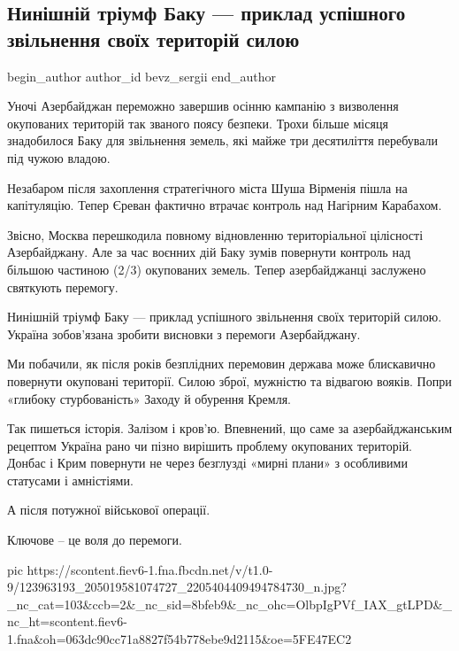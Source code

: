  
 
 
 
 
 
\subsection{Нинішній тріумф Баку — приклад успішного звільнення своїх територій силою}
\label{sec:10_11_2020.fb.bevz_sergii.1.triumf_baku}
\ifcmt
	begin_author
   author_id bevz_sergii
	end_author
\fi

Уночі Азербайджан переможно завершив осінню кампанію з визволення окупованих
територій так званого поясу безпеки. Трохи більше місяця знадобилося Баку для
звільнення земель, які майже три десятиліття перебували під чужою владою.

Незабаром після захоплення стратегічного міста Шуша Вірменія пішла на
капітуляцію. Тепер Єреван фактично втрачає контроль над Нагірним Карабахом.

Звісно, Москва перешкодила повному відновленню територіальної цілісності
Азербайджану. Але за час воєнних дій Баку зумів повернути контроль над більшою
частиною (2/3) окупованих земель. Тепер азербайджанці заслужено святкують
перемогу.

Нинішній тріумф Баку — приклад успішного звільнення своїх територій силою.
Україна зобов’язана зробити висновки з перемоги Азербайджану. 

Ми побачили, як після років безплідних перемовин держава може блискавично
повернути окуповані території. Силою зброї, мужністю та відвагою вояків. Попри
«глибоку стурбованість» Заходу й обурення Кремля. 

Так пишеться історія. Залізом і кров’ю. Впевнений, що саме за азербайджанським
рецептом Україна рано чи пізно вирішить проблему окупованих територій. Донбас і
Крим повернути не через безглузді «мирні плани» з особливими статусами і
амністіями. 

А після потужної військової операції.

Ключове – це воля до перемоги.

\ifcmt
pic https://scontent.fiev6-1.fna.fbcdn.net/v/t1.0-9/123963193_205019581074727_2205404409494784730_n.jpg?_nc_cat=103&ccb=2&_nc_sid=8bfeb9&_nc_ohc=OlbpIgPVf_IAX_gtLPD&_nc_ht=scontent.fiev6-1.fna&oh=063dc90cc71a8827f54b778ebe9d2115&oe=5FE47EC2
\fi
